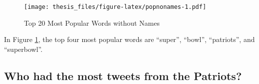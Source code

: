 \documentclass[12pt,twoside]{reedthesis}
\newenvironment{Shaded}{\begin{snugshade}}{\end{snugshade}}
\newcommand{\KeywordTok}[1]{\textcolor[rgb]{0.13,0.29,0.53}{\textbf{#1}}}
\newcommand{\DataTypeTok}[1]{\textcolor[rgb]{0.13,0.29,0.53}{#1}}
\newcommand{\StringTok}[1]{\textcolor[rgb]{0.31,0.60,0.02}{#1}}
\newcommand{\CommentTok}[1]{\textcolor[rgb]{0.56,0.35,0.01}{\textit{#1}}}
\newcommand{\OtherTok}[1]{\textcolor[rgb]{0.56,0.35,0.01}{#1}}
\newcommand{\OperatorTok}[1]{\textcolor[rgb]{0.81,0.36,0.00}{\textbf{#1}}}
\newcommand{\NormalTok}[1]{#1}
\begin{document}
\small
\begin{Shaded}
\end{Shaded}
\begin{figure}
\centering
\texttt{[image: thesis\_files/figure-latex/popnonames-1.pdf]}
\caption{\label{fig:popnonames}Top 20 Most Popular Words without Names}
\end{figure}
\normalsize
In Figure \ref{fig:popnonames}, the top four most popular words are
``super'', ``bowl'', ``patriots'', and ``superbowl''.

\subsection{Who had the most tweets from the
Patriots?}\label{who-had-the-most-tweets-from-the-patriots}
\end{document}

